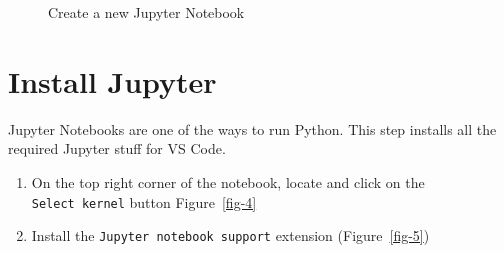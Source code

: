 \documentclass[
  letterpaper,
  DIV=11,
  numbers=noendperiod]{scrreprt}
\providecommand{\tightlist}{%
  \setlength{\itemsep}{0pt}\setlength{\parskip}{0pt}}\usepackage{longtable,booktabs,array}
\begin{document}
\begin{figure}


\caption{\label{fig-3}Create a new Jupyter Notebook}

\end{figure}%

\section*{Install Jupyter}\label{install-jupyter}


Jupyter Notebooks are one of the ways to run Python. This step installs
all the required Jupyter stuff for VS Code.

\begin{enumerate}
\def\labelenumi{\arabic{enumi}.}
\tightlist
\item
  On the top right corner of the notebook, locate and click on the
  \texttt{Select\ kernel} button Figure~\ref{fig-4}
\item
  Install the \texttt{Jupyter\ notebook\ support} extension
  (Figure~\ref{fig-5})
\end{enumerate}
\end{document}
